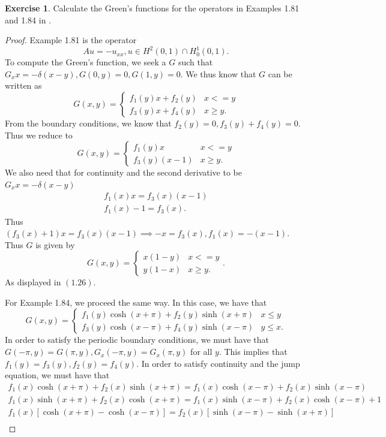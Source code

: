 \documentclass{amsart}
\theoremstyle{plain}
\theoremstyle{definition}
\newtheorem{exer}{Exercise}[section]
\begin{document}
\begin{exer}
    Calculate the Green’s functions for the operators in Examples 1.81 and 1.84 in \cite{lord2014introduction}.
\end{exer}
\begin{proof}
Example 1.81 is the operator
$$Au = -u_{xx}, u\in H^2(0,1)\cap H^1_0(0,1).$$
To compute the Green's function, we seek a $G$ such that 
$G_xx = -\delta(x-y), G(0,y) = 0, G(1,y) = 0.$
We thus know that $G$ can be written as 
$$G(x,y) = \begin{cases}f_1(y)x+f_2(y)& x<= y \\ f_3(y)x+f_4(y) & x\geq y.\end{cases}$$
From the boundary conditions, we know that $f_2(y) = 0, f_3(y)+f_4(y) = 0$. Thus we reduce to 
$$G(x,y) = \begin{cases}f_1(y)x& x<= y \\ f_3(y)(x-1) & x\geq y.\end{cases}$$
We also need that for continuity and the second derivative to be $G_xx = -\delta (x-y)$
\begin{gather*}
    f_1(x)x = f_3(x)(x-1)\\
    f_1(x)-1 = f_3(x).
\end{gather*}
Thus $(f_3(x)+1)x = f_3(x)(x-1) \implies -x = f_3(x), f_1(x) = -(x-1).$
Thus $G$ is given by
$$G(x,y) = \begin{cases}x(1-y)& x<= y \\ y(1-x)& x\geq y.\end{cases}.$$
As displayed in $(1.26).$
\par For Example 1.84, we proceed the same way. In this case, we have that 
$$G(x,y) = \begin{cases}
    f_1(y)\cosh(x+\pi) + f_2(y)\sinh(x+\pi) & x\leq y\\
    f_3(y)\cosh(x-\pi) + f_4(y)\sinh(x-\pi)& y\leq x.
\end{cases}$$
In order to satisfy the periodic boundary conditions, we must have that $G(-\pi,y) = G(\pi,y), G_x(-\pi,y) = G_x(\pi,y)$ for all $y$. This implies that $f_1(y) = f_3(y), f_2(y)=f_4(y).$ In order to satisfy continuity and the jump equation, we must have that
\begin{gather*}
    f_1(x)\cosh(x+\pi) + f_2(x)\sinh(x+\pi) = f_1(x)\cosh(x-\pi)+f_2(x)\sinh(x-\pi)\\
    f_1(x)\sinh(x+\pi) + f_2(x)\cosh(x+\pi) = f_1(x)\sinh(x-\pi)+f_2(x)\cosh(x-\pi)+1\\
    f_1(x)\left[\cosh(x+\pi)-\cosh(x-\pi)\right] = f_2(x)\left[\sinh(x-\pi)-\sinh(x+\pi)\right]\\

\end{gather*}
\end{proof}
\end{document}
